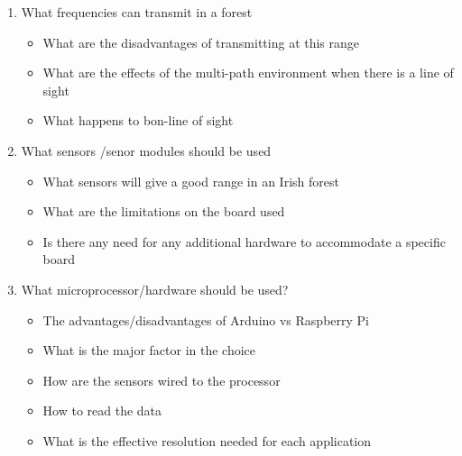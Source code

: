 		\begin{enumerate}
			\item What frequencies can transmit in a forest
			\begin{itemize}
				\item What are the disadvantages of transmitting at this range
				\item What are the effects of the multi-path environment when there is a line of sight
				\item What happens to bon-line of sight
			\end{itemize}
			\item What sensors /senor modules should be used
			\begin{itemize}
				\item What sensors will give a good range in an Irish forest
				\item What are the limitations on the board used
				\item Is there any need for any additional hardware to  accommodate a specific board 
			\end{itemize}
			\item What microprocessor/hardware should be used?
			\begin{itemize}
				\item The advantages/disadvantages of  Arduino vs Raspberry Pi
				\item What is the major factor in the choice 
				\item How are the sensors wired to the processor 
				\item How to read the  data
				\item What is the effective resolution needed for each application
			\end{itemize}
			
		\end{enumerate}
	\newpage
